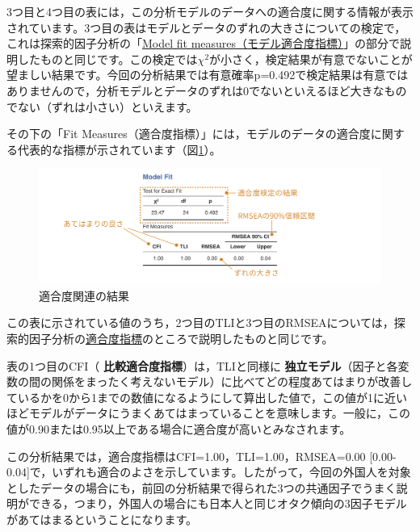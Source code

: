 \documentclass[
  12pt,
  a5jpaper,
  lualatex, ja=standard]{bxjsbook}
\renewcommand{\emph}[1]{\textbf{\color{emph} #1}}
\begin{document}
3つ目と4つ目の表には，この分析モデルのデータへの適合度に関する情報が表示されています。3つ目の表はモデルとデータのずれの大きさについての検定で，これは探索的因子分析の「\protect\hyperlink{subsub:factor-efa-fit-measures}{Model fit measures（モデル適合度指標）}」の部分で説明したものと同じです。この検定では\(\chi^2\)が小さく，検定結果が有意でないことが望ましい結果です。今回の分析結果では有意確率p=0.492で検定結果は有意ではありませんので，分析モデルとデータのずれは0でないといえるほど大きなものでない（ずれは小さい）といえます。

その下の「Fit Measures（適合度指標）」には，モデルのデータの適合度に関する代表的な指標が示されています（図\ref{fig:factor-cfa-results2}）。

\begin{figure}[!ht]

{\centering \includegraphics[width=1\linewidth]{images/factor/cfa-results2} 

}

\caption{適合度関連の結果}\label{fig:factor-cfa-results2}
\end{figure}

この表に示されている値のうち，2つ目のTLIと3つ目のRMSEAについては，探索的因子分析の\protect\hyperlink{subsub:factor-efa-fit-measures}{適合度指標}のところで説明したものと同じです。

表の1つ目のCFI（\emph{比較適合度指標}）は，TLIと同様に\emph{独立モデル}（因子と各変数の間の関係をまったく考えないモデル）に比べてどの程度あてはまりが改善しているかを0から1までの数値になるようにして算出した値で，この値が1に近いほどモデルがデータにうまくあてはまっていることを意味します。一般に，この値が0.90または0.95以上である場合に適合度が高いとみなされます。

この分析結果では，適合度指標はCFI=1.00，TLI=1.00，RMSEA=0.00 {[}0.00-0.04{]}で，いずれも適合のよさを示しています。したがって，今回の外国人を対象としたデータの場合にも，前回の分析結果で得られた3つの共通因子でうまく説明ができる，つまり，外国人の場合にも日本人と同じオタク傾向の3因子モデルがあてはまるということになります。
\end{document}
